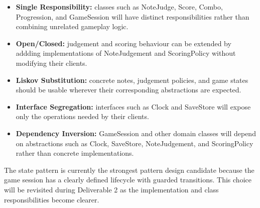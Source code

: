 \documentclass[12pt,a4paper]{article}
\newcommand\tab[1][1cm]{\hspace*{#1}}
\begin{document}
    \begin{itemize}
        \item \textbf{Single Responsibility:} classes such as NoteJudge, Score, Combo, Progression, and GameSession will have distinct responsibilities rather than combining unrelated gameplay logic.
        \item \textbf{Open/Closed:} judgement and scoring behaviour can be extended by addding implementations of NoteJudgement and ScoringPolicy without modifying their clients.
        \item \textbf{Liskov Substitution:} concrete notes, judgement policies, and game states should be usable wherever their corresponding abstractions are expected.
        \item \textbf{Interface Segregation:} interfaces such as Clock and SaveStore will expose only the operations needed by their clients.
        \item \textbf{Dependency Inversion:} GameSession and other domain classes will depend on abstractions such as Clock, SaveStore, NoteJudgement, and ScoringPolicy rather than concrete implementations.
    \end{itemize} 
    \tab The state pattern is currently the strongest pattern design candidate because the game session has a clearly defined lifecycle with guarded transitions.
    This choice will be revisited during Deliverable 2 as the implementation and class responsibilities become clearer.
\end{document}
